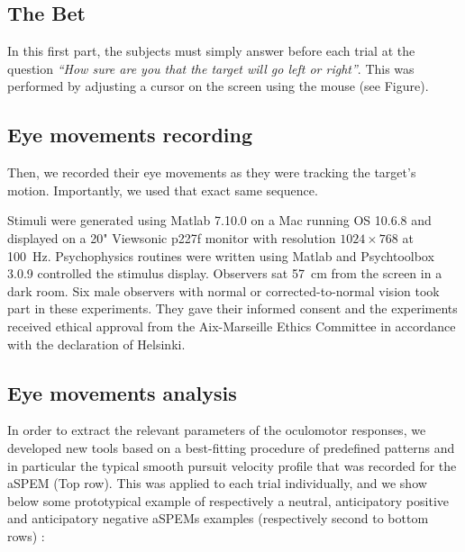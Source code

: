 \documentclass[profile,final,english, draft]{article}%
\begin{document}
\subsection{The Bet}
In this first part, the subjects must simply answer before each trial at the question \textit{ ``How sure are you that the target will go left or right''}. This was performed by adjusting a cursor on the screen using the mouse (see Figure).



\subsection{Eye movements recording}
Then, we recorded their eye movements as they were tracking the target's motion. Importantly, we used that exact same sequence.

%
Stimuli were generated using Matlab 7.10.0 on a Mac running OS 10.6.8 and displayed on a 20" Viewsonic p227f monitor with resolution $1024\times 768$ at 100~\si{\Hz}. Psychophysics routines were written using Matlab and Psychtoolbox 3.0.9 controlled the stimulus display. Observers sat 57~\si{\cm} from the screen in a dark room. Six male observers with normal or corrected-to-normal vision took part in these experiments. They gave their informed consent and the experiments received ethical approval from the Aix-Marseille Ethics Committee in accordance with the declaration of Helsinki.


\subsection{Eye movements analysis}

In order to extract the relevant parameters of the oculomotor responses, we developed new tools based on a best-fitting procedure of predefined patterns and in particular the typical smooth pursuit velocity profile that was recorded for the aSPEM (Top row). This was applied to each trial individually, and we show below some prototypical example of respectively a neutral, anticipatory positive and anticipatory negative aSPEMs examples (respectively second to bottom rows) :
\end{document}
